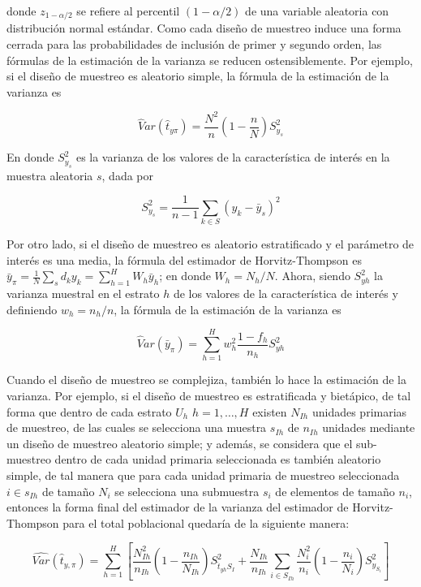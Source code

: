 \documentclass[
  12pt,
  spanish,
]{book}
\begin{document}
donde \(z_{1-\alpha / 2}\) se refiere al percentil \((1-\alpha / 2)\) de una variable aleatoria con distribución normal estándar. Como cada diseño de muestreo induce una forma cerrada para las probabilidades de inclusión de primer y segundo orden, las fórmulas de la estimación de la varianza se reducen ostensiblemente. Por ejemplo, si el diseño de muestreo es aleatorio simple, la fórmula de la estimación de la varianza es

\[
\widehat Var(\hat{t}_{y\pi}) = \frac{N^2}{n} \left( 1- \frac{n}{N} \right) S^2_{y_s}
\]

En donde \(S^2_{y_s}\) es la varianza de los valores de la característica de interés en la muestra aleatoria \(s\), dada por

\[
S^2_{y_s}=\frac{1}{n-1}\sum_{k\in S}(y_k-\bar{y}_s)^2
\]

Por otro lado, si el diseño de muestreo es aleatorio estratificado y el parámetro de interés es una media, la fórmula del estimador de Horvitz-Thompson es \(\bar{y}_{\pi} = \frac{1}{N}\sum_s d_k y_k = \sum_{h=1}^H W_h \bar{y}_h\); en donde \(W_h = N_h/N\). Ahora, siendo \(S^2_{yh}\) la varianza muestral en el estrato \(h\) de los valores de la característica de interés y definiendo \(w_h = n_h/n\), la fórmula de la estimación de la varianza es

\[
\widehat Var(\bar{y}_{\pi}) = \sum_{h=1}^H w_h^2 \frac{1-f_h}{n_h}S^2_{yh}
 \]

Cuando el diseño de muestreo se complejiza, también lo hace la estimación de la varianza. Por ejemplo, si el diseño de muestreo es estratificada y bietápico, de tal forma que dentro de cada estrato \(U_h\) \(h=1,\ldots, H\) existen \(N_{Ih}\) unidades primarias de muestreo, de las cuales se selecciona una muestra \(s_{Ih}\) de \(n_{Ih}\) unidades mediante un diseño de muestreo aleatorio simple; y además, se considera que el sub-muestreo dentro de cada unidad primaria seleccionada es también aleatorio simple, de tal manera que para cada unidad primaria de muestreo seleccionada \(i\in s_{Ih}\) de tamaño \(N_i\) se selecciona una submuestra \(s_i\) de elementos de tamaño \(n_i\), entonces la forma final del estimador de la varianza del estimador de Horvitz-Thompson para el total poblacional quedaría de la siguiente manera:

\[
\widehat{Var}(\hat{t}_{y,\pi})=
\sum_{h=1}^H\left[\frac{N_{Ih}^2}{n_{Ih}}\left(1-\frac{n_{Ih}}{N_{Ih}}\right)S^2_{\hat{t}_{yh}S_I}+
\frac{N_{Ih}}{n_{Ih}}\sum_{i\in S_{Ih}}\frac{N_i^2}{n_i}\left(1-\frac{n_i}{N_i}\right)S^2_{y_{S_i}}\right]
\]
\end{document}
